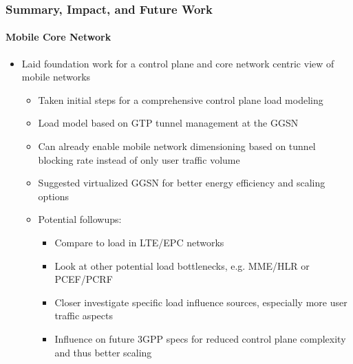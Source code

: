 \documentclass{beamer}
\begin{document}

\begin{frame}
	\frametitle{Summary, Impact, and Future Work}
	\framesubtitle{Mobile Core Network}

	\begin{itemize}
		\item Laid foundation work for a control plane and core network centric view of mobile networks
			\begin{itemize}
				\item Taken initial steps for a comprehensive control plane load modeling
				\item Load model based on GTP tunnel management at the GGSN
				\item Can already enable mobile network dimensioning based on tunnel blocking rate instead of only user traffic volume
				\item Suggested virtualized GGSN for better energy efficiency and scaling options
				\item Potential followups:
				\begin{itemize}
					\item Compare to load in LTE/EPC networks
					\item Look at other potential load bottlenecks, e.g. MME/HLR or PCEF/PCRF
					\item Closer investigate specific load influence sources, especially more user traffic aspects
					\item Influence on future 3GPP specs for reduced control plane complexity and thus better scaling
				\end{itemize}
			\end{itemize}
	\end{itemize}

\end{frame}
\end{document}
